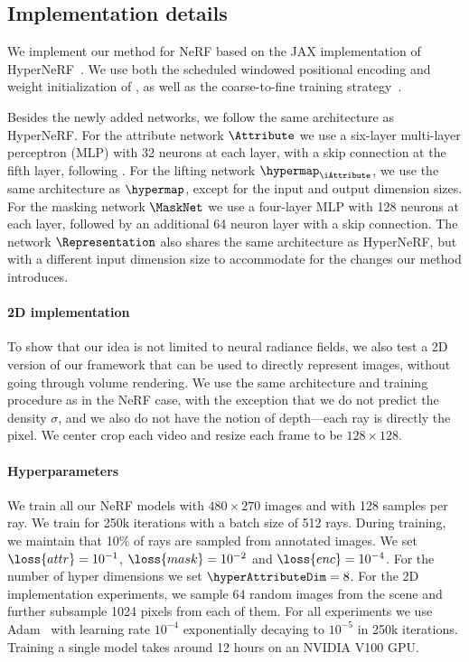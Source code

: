   \subsection{Implementation details}
    We implement our method for NeRF based on the JAX \cite{jax2018github}
    implementation of HyperNeRF~\cite{park2021hypernerf}.
    We use both the scheduled windowed positional encoding and weight
    initialization of \cite{park2020deformable}, as well as the coarse-to-fine
    training strategy~\cite{park2021hypernerf}.

    Besides the newly added networks, we follow the same architecture as
    HyperNeRF.
    For the attribute network $\Attribute$ we use a six-layer multi-layer
    perceptron (MLP) with 32 neurons at each layer, with a skip connection at the
    fifth layer, following \cite{park2020deformable,park2021hypernerf}.
    For the lifting network $\hypermap_\iAttribute$, we use the same architecture
    as $\hypermap$, except for the input and output dimension sizes.
    For the masking network $\MaskNet$ we use a four-layer MLP with 128 neurons at
    each layer, followed by an additional 64 neuron layer with a skip connection.
    The network $\Representation$ also shares the same architecture as HyperNeRF,
    but with a different input dimension size to accommodate for the changes our
    method introduces.

    \paragraph{2D implementation}
      To show that our idea is not limited to neural radiance fields, we also test a
      2D version of our framework that can be used to directly represent images,
      without going through volume rendering.
      We use the same architecture and training procedure as in the NeRF case, with
      the exception that we do not predict the density $\sigma$, and we also do not
      have the notion of depth---each ray is directly the pixel.
      We center crop each video and resize each frame to be $128\times128$.

    \paragraph{Hyperparameters}
      We train all our NeRF models with $480\times270$ images and with 128 samples
      per ray.
      We train for 250k iterations with a batch size of 512 rays.
      During training, we maintain that 10\% of rays are sampled from annotated
      images.
      We set $\loss{attr}=10^{-1}$, $\loss{mask}=10^{-2}$ and $\loss{enc}=10^{-4}$.
      For the number of hyper dimensions we set $\hyperAttributeDim = 8$.
      For the 2D implementation experiments, we sample 64 random images from the
      scene and further subsample 1024 pixels from each of them.
      For all experiments we use Adam~\cite{kingma2014adam} with learning rate
      $10^{-4}$ exponentially decaying to $10^{-5}$ in 250k iterations.
      Training a single model takes around 12 hours on an NVIDIA V100 GPU.

